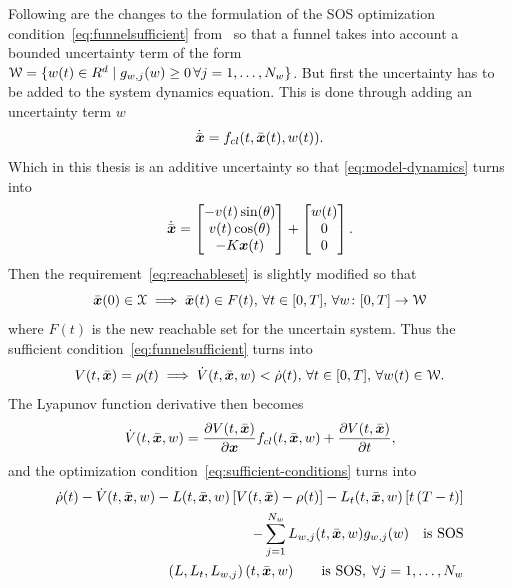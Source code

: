 Following are the changes to the formulation of the \ac{SOS} optimization
condition~\cref{eq:funnelsufficient} from~\cite{majumdarRobustOnlineMotion2013}
so that a funnel takes into account a bounded uncertainty term of the form
\(\mathcal{W} = \lbrace w(t) \in R^d \mid g_{w,j}(w) \geq 0\, \forall j =
  1,\ldots,N_w\rbrace\). But first the uncertainty has to be added to the system
dynamics equation. This is done through adding an uncertainty term \(w\)
\begin{equation}
  \dot{\bar{\boldsymbol{x}}} = f_{cl}(t, \bar{\boldsymbol{x}}(t), w(t)).
\end{equation}
Which in this thesis is an additive uncertainty so that \cref{eq:model-dynamics}
turns into
\begin{equation}
  \dot{\bar{\vect{x}}} = %
  \begin{bmatrix}
    -v(t)\sin(\theta) \\
    v(t)\cos(\theta) \\
    -K\vect{x} (t) \\
  \end{bmatrix}
  +
  \begin{bmatrix}
    w(t) \\
    0 \\
    0
  \end{bmatrix}.
\end{equation}
Then the requirement~\cref{eq:reachableset} is slightly modified so that
\begin{equation}
  \label{eq:uncertain-reachableset}
  \bar{\boldsymbol{x}}(0) \in \mathcal{X} \implies \bar{\boldsymbol{x}}(t) \in F(t),\, \forall t \in
  [0,T], \, \forall w \colon [0,T] \rightarrow \mathcal{W}
\end{equation} 
where \(F(t)\) is the new reachable set for the uncertain system. Thus the
sufficient condition~\cref{eq:funnelsufficient} turns into
\begin{equation}
  \label{eq:funneluncertain-sufficient}
  V(t,\bar{\boldsymbol{x}}) = \rho(t) \implies \dot{V}(t,\bar{\boldsymbol{x}},w) < \dot{\rho}(t), \, \forall t \in [0,T], \, \forall w(t) \in \mathcal{W}.
\end{equation}
The Lyapunov function derivative then becomes
\begin{equation}
  \dot{V}(t,\bar{\boldsymbol{x}}, w) = \frac{\partial V(t,\bar{\boldsymbol{x}})}{\partial \boldsymbol{x}} f_{cl}(t,\bar{\boldsymbol{x}},w) + \frac{\partial V(t,\bar{\boldsymbol{x}})}{\partial t},
\end{equation}
and the optimization condition~\cref{eq:sufficient-conditions} turns into
\begin{align}
  \label{eq:optimizationconditionuncertain}
  \dot{\rho}(t) - \dot{V}(t,\bar{\boldsymbol{x}},w) - L(t,\bar{\boldsymbol{x}},w) \left[ V(t,\bar{\boldsymbol{x}}) - \rho(t) \right] - L_{t}(t,\bar{\boldsymbol{x}},w)\left[ t\left( T - t \right) \right]  & \nonumber \\
  - \sum_{j=1}^{N_{w}} L_{w,j}(t,\bar{\boldsymbol{x}},w)g_{w,j}(w) \quad \text{is SOS} &  \\
  \left( L, L_t, L_{w,j} \right) (t,\bar{\boldsymbol{x}},w) \qquad \text{is SOS}, \; \forall j = 1,\ldots,N_w \nonumber
\end{align}

